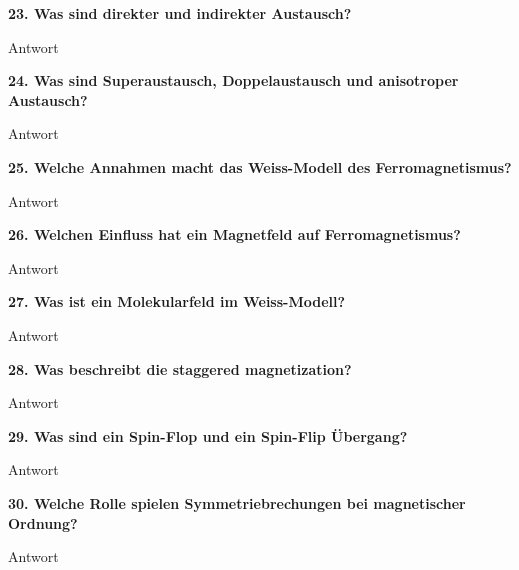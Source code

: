 \noindent\textbf{23. Was sind direkter und indirekter Austausch?}\\
\begin{addmargin}[25pt]{0pt}
Antwort\\
\end{addmargin}

\noindent\textbf{24. Was sind Superaustausch, Doppelaustausch und anisotroper Austausch?}\\
\begin{addmargin}[25pt]{0pt}
Antwort\\
\end{addmargin}

\noindent\textbf{25. Welche Annahmen macht das Weiss-Modell des Ferromagnetismus?}\\
\begin{addmargin}[25pt]{0pt}
Antwort\\
\end{addmargin}

\noindent\textbf{26. Welchen Einfluss hat ein Magnetfeld auf Ferromagnetismus?}\\
\begin{addmargin}[25pt]{0pt}
Antwort\\
\end{addmargin}

\noindent\textbf{27. Was ist ein Molekularfeld im Weiss-Modell?}\\
\begin{addmargin}[25pt]{0pt}
Antwort\\
\end{addmargin}

\noindent\textbf{28. Was beschreibt die \glqq staggered magnetization\grqq ?}\\
\begin{addmargin}[25pt]{0pt}
Antwort\\
\end{addmargin}

\noindent\textbf{29. Was sind ein \glqq Spin-Flop\grqq\; und ein \glqq Spin-Flip\grqq \; Übergang?}\\
\begin{addmargin}[25pt]{0pt}
Antwort\\
\end{addmargin}

\noindent\textbf{30. Welche Rolle spielen Symmetriebrechungen bei magnetischer Ordnung?}\\
\begin{addmargin}[25pt]{0pt}
Antwort\\
\end{addmargin}

